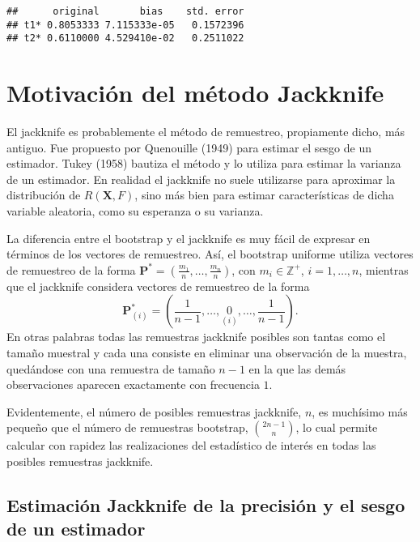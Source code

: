 \documentclass[
]{book}
\theoremstyle{definition}
\theoremstyle{definition}
\theoremstyle{definition}
\theoremstyle{remark}
\begin{document}
\begin{verbatim}
##      original       bias    std. error
## t1* 0.8053333 7.115333e-05   0.1572396
## t2* 0.6110000 4.529410e-02   0.2511022
\end{verbatim}

\hypertarget{cap3}{%
\chapter{Motivación del método Jackknife}\label{cap3}}

El jackknife es probablemente el método de remuestreo, propiamente
dicho, más antiguo. Fue propuesto por Quenouille (1949) para estimar el
sesgo de un estimador. Tukey (1958) bautiza el método y lo utiliza para
estimar la varianza de un estimador. En realidad el jackknife no suele
utilizarse para aproximar la distribución de \(R\left( \mathbf{X},F \right)\),
sino más bien para estimar características de dicha
variable aleatoria, como su esperanza o su varianza.

La diferencia entre el bootstrap y el jackknife es muy fácil de expresar
en términos de los vectores de remuestreo. Así, el bootstrap uniforme
utiliza vectores de remuestreo de la forma
\(\mathbf{P}^{\ast}=\left( \frac{m_1}{n},\ldots ,\frac{m_n}{n} \right)\), con
\(m_i\in \mathbb{Z}^{+}\), \(i=1,\ldots ,n\), mientras que el jackknife considera
vectores de remuestreo de la forma
\[\mathbf{P}_{(i)}^{\ast}=\left( \frac{1}{n-1},\ldots ,\underset{(i)}{0}
,\ldots ,\frac{1}{n-1} \right).\]
En otras palabras todas las remuestras
jackknife posibles son tantas como el tamaño muestral y cada una
consiste en eliminar una observación de la muestra, quedándose con una
remuestra de tamaño \(n-1\) en la que las demás observaciones aparecen
exactamente con frecuencia \(1\).

Evidentemente, el número de posibles remuestras jackknife, \(n\), es
muchísimo más pequeño que el número de remuestras bootstrap,
\(\binom{2n-1}{n}\), lo cual permite calcular con rapidez las realizaciones
del estadístico de interés en todas las posibles remuestras jackknife.

\hypertarget{estimaciuxf3n-jackknife-de-la-precisiuxf3n-y-el-sesgo-de-un-estimador}{%
\section{Estimación Jackknife de la precisión y el sesgo de un estimador}\label{estimaciuxf3n-jackknife-de-la-precisiuxf3n-y-el-sesgo-de-un-estimador}}
\end{document}
